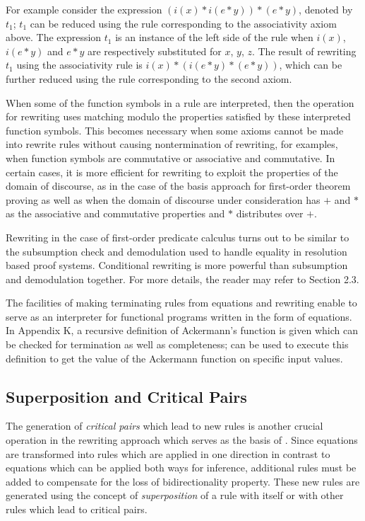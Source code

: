 For example consider the expression $(i(x) * i(e * y)) * (e * y)$,
denoted by $t_1$; $t_1$ can be reduced using the rule corresponding to
the associativity axiom above.  
The expression $t_1$ is an instance of the left side
of the rule when
$i(x)$, $i(e * y)$ and $e * y$
are respectively substituted for $x$, $y$, $z$.
The result of rewriting $t_1$ using the
associativity rule is $i(x) * (i(e* y) * (e * y))$, which can be
further reduced using the rule corresponding to the second axiom.
  
When some of the function symbols in a rule are interpreted, then the
operation for rewriting uses matching modulo the properties satisfied
by these interpreted function symbols.  This becomes necessary when
some axioms cannot be made into rewrite rules without causing
nontermination of rewriting, for examples, when function symbols are
commutative or associative and commutative.  In certain cases, it is
more efficient for rewriting to exploit the properties of the domain
of discourse, as in the case of the \Groebner basis approach for
first-order theorem proving as well as when the domain of discourse
under consideration has $+$ and $*$ as the associative and commutative
properties and $*$ distributes over $+$.

Rewriting in the case of first-order predicate calculus turns out to
be similar to the subsumption check and demodulation used to handle
equality in resolution based proof systems. 
Conditional rewriting is more  powerful than
subsumption and demodulation together.
For more details,
the reader may refer to Section 2.3.

The facilities of making terminating rules from equations and
rewriting enable \RRL to serve as an interpreter for functional
programs written in the form of equations. In Appendix K, a recursive
definition of Ackermann's function is given which can be checked for
termination as well as completeness; \RRL can be used to execute this
definition to get the value of the Ackermann function on specific
input values.

\subsection{Superposition and Critical Pairs}

The generation of {\em critical pairs} which lead to new rules is another
crucial operation in the rewriting approach which serves as
the basis of \ERRL. Since equations are transformed into 
rules which are applied in one direction in contrast to equations
which can be applied both ways for inference, additional
rules must be added to compensate for the loss of bidirectionality
property. These new rules are generated using the concept
of {\em superposition} of a rule with itself or with other rules
which lead to critical pairs.

